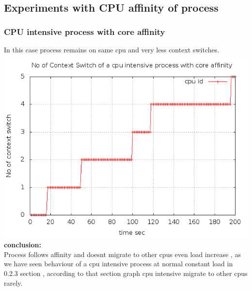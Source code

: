 \documentclass[a4paper,11pt]{report}
\begin{document}
 \subsection{Experiments with CPU affinity of process}
 \subsubsection{CPU intensive process with core affinity}
 In this case process remains on same cpu and very less context switches.\\
 \includegraphics[scale=0.5]{csaff.png}\\
 {\bf conclusion:} \\Process follows affinity and doesnt migrate to other cpus even load increase , as we have seen behaviour of a cpu intensive process at normal constant load in 0.2.3 section , according to that section graph cpu intensive migrate to other cpus rarely.
\end{document}
